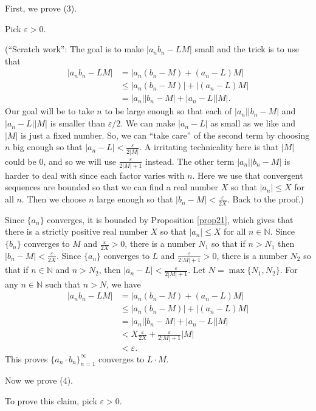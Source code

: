 \documentclass[12pt]{amsart}
\def\e{\varepsilon}
\newcommand{\N}{\mathbb{N}}
\numberwithin{equation}{section}
\theoremstyle{plain} %
\theoremstyle{definition}
\theoremstyle{remark}
\begin{document}
\begin{framed}
First, we prove (3).

Pick $\e > 0$.
	
	(``Scratch work'': The goal is to make 
	$|a_nb_n - LM|$ small and the trick is to use that
	$$
	\begin{aligned}
	|a_nb_n - LM| & = |a_n(b_n - M) + (a_n - L)M|  \\
	& \leq |a_n(b_n - M)| + |(a_n - L)M| \\
	& = |a_n| |b_n - M| + |a_n - L| |M|.
	\end{aligned}
	$$
	Our goal will be to take $n$ to be large enough so that each of $|a_n| |b_n - M|$ and $|a_n - L| |M|$ is smaller than $\e/2$.
	We can make $|a_n -L|$ as small as we like and $|M|$ is just a fixed number. So, we can ``take care'' of the second term by choosing $n$ big enough so
	that $|a_n - L| < \frac{\e}{2|M|}$. A irritating technicality here is
	that $|M|$ could be $0$, and so we will use $\frac{\e}{2|M|+1}$ instead. 
	The other term   $|a_n| |b_n - M|$ is harder to deal with since each factor varies with $n$. 
	Here we use that convergent sequences are bounded so that we can find a real number $X$ so that $|a_n| \leq X$ for all $n$. Then we choose $n$ large enough
	so that $|b_n - M| < \frac{\e}{2 X}$. Back to the proof.)
	
	Since $\{a_n\}$ converges, it is bounded by Proposition \ref{prop21}, which gives that  there is a strictly positive real number $X$ so that $|a_n| \leq X$ for all $n \in \N$.
	Since $\{b_n\}$
	converges to $M$ and $\frac{\e}{2 X} > 0$, there is a number $N_1$ so that if $n > N_1$ then $|b_n - M| < \frac{\e}{2 X}$. Since $\{a_n\}$ converges to $L$
	and $\frac{\e}{2|M| + 1} > 0$, there is a number
	$N_2$ so that if $n \in \N$ and $n > N_2$, then $|a_n - L| < \frac{\e}{2|M| + 1}$. Let $N = \max\{N_1, N_2\}$. For any $n \in \N$ such that $n > N$, we have
	$$
	\begin{aligned}
	|a_nb_n - LM| & = |a_n(b_n - M) + (a_n - L)M| \\
	& \leq |a_n(b_n - M)| + |(a_n - L)M| \\
	& = |a_n| |b_n - M| + |a_n - L| |M| \\
	& < X \frac{\e}{2 X} + \frac{\e}{2|M| + 1} |M| \\
	& < \e.
	\end{aligned}
	$$
	This proves $\{a_n  \cdot b_n\}_{n=1}^\infty$ converges to $L \cdot M$.
	
Now we prove (4).

To prove this claim,  pick $\e > 0$. 
	

\end{framed}
\end{document}
